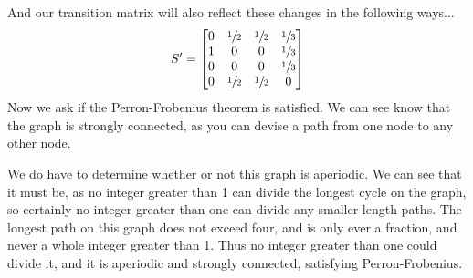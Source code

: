 \documentclass[11pt]{article}
\begin{document}
\begin{enumerate}
\begin{center}
            \end{center}

            And our transition matrix will also reflect these changes in the
            following ways...
            \[
                S' = 
                \begin{bmatrix}
                    0   &   \sfrac{1}{2}    &   \sfrac{1}{2} &   \sfrac{1}{3} \\
                    1   &   0               &   0            &   \sfrac{1}{3} \\
                    0   &   0               &   0            &   \sfrac{1}{3} \\
                    0   &   \sfrac{1}{2}    &   \sfrac{1}{2} &   0            \\
                \end{bmatrix}
            \]
            Now we ask if the Perron-Frobenius theorem is satisfied. We can see
            know that the graph is strongly connected, as you can devise a path
            from one node to any other node.

            We do have to determine whether or not this graph is aperiodic. We
            can see that it must be, as no integer greater than 1 can divide
            the longest cycle on the graph, so certainly no integer greater
            than one can divide any smaller length paths. The longest path on
            this graph does not exceed four, and is only ever a fraction,
            and never a whole integer greater than 1. Thus no integer greater
            than one could divide it, and it is aperiodic and strongly
            connected, satisfying Perron-Frobenius. 


\end{enumerate}
\end{document}
